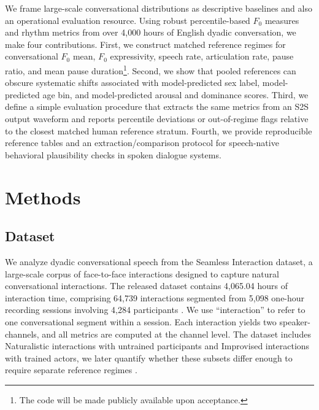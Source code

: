 \documentclass[conference]{IEEEtran}
\begin{document}
We frame large-scale conversational distributions as descriptive baselines and also an operational evaluation resource. 
Using robust percentile-based $F_0$ measures and rhythm metrics from over 4{,}000 hours of English dyadic conversation, we make four contributions. 
First, we construct matched reference regimes for conversational $F_0$ mean, $F_0$ expressivity, speech rate, articulation rate, pause ratio, and mean pause duration\footnote{The code will be made publicly available upon acceptance.}. 
Second, we show that pooled references can obscure systematic shifts associated with model-predicted sex label, model-predicted age bin, and model-predicted arousal and dominance scores. 
Third, we define a simple evaluation procedure that extracts the same metrics from an S2S output waveform and reports percentile deviations or out-of-regime flags relative to the closest matched human reference stratum. 
Fourth, we provide reproducible reference tables and an extraction/comparison protocol for speech-native behavioral plausibility checks in spoken dialogue systems.

\section{Methods}
\label{sec:methods}

\subsection{Dataset}
We analyze dyadic conversational speech from the Seamless Interaction dataset, a large-scale corpus of face-to-face interactions designed to capture natural conversational interactions.
The released dataset contains 4,065.04 hours of interaction time, comprising 64,739 interactions segmented from 5,098 one-hour recording sessions involving 4,284 participants \cite{seamless_interaction}. 
We use ``interaction'' to refer to one conversational segment within a session. 
Each interaction yields two speaker-channels, and all metrics are computed at the channel level. 
The dataset includes Naturalistic interactions with untrained participants and Improvised interactions with trained actors, we later quantify whether these subsets differ enough to require separate reference regimes \cite{fusaroli_dialog_2014, wynn_conversational_2024}.
\end{document}
